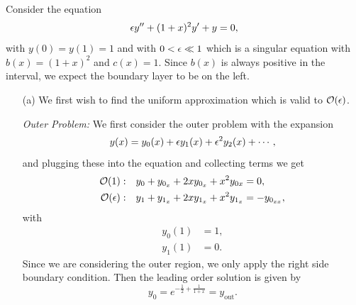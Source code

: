 \documentclass[12pt]{report}
\begin{document}
\begin{solution}

    \noindent
    Consider the equation
    \[
        {\epsilon} y'' + (1+x)^2y' + y = 0,   
    \]
    with $y(0) = y(1) = 1$ and with $0 < {\epsilon} \ll 1$ which is a singular equation with $b(x) = (1+x)^2$ and $c(x) = 1$. Since $b(x)$ is always positive in the interval, we expect the boundary layer to be on the left. 
    \begin{enumerate}
        \item [(a)]
        We first wish to find the uniform approximation which is valid to ${\mathcal{O}}({\epsilon})$.
        
        \noindent
        {\it Outer Problem: }
        We first consider the outer problem with the expansion
        \[ 
            y(x) = y_0(x) + {\epsilon} y_1(x) + {\epsilon}^2 y_2(x)+\cdots,
        \]
        and plugging these into the equation and collecting terms we get
        \begin{align*}
            {\mathcal{O}}(1):& ~~~ y_0 + y_{0_x} + 2x y_{0_x} + x^2 y_{0{x}} = 0,\\
            {\mathcal{O}}({\epsilon}):& ~~~ y_1 + y_{1_x} + 2xy_{1_x} + x^2 y_{1_x} = - y_{0_{xx}},
        \end{align*}
        with
        \begin{align*}
            y_0(1) &= 1,\\
            y_1(1) &= 0.
        \end{align*}
        Since we are considering the outer region, we only apply the right side boundary condition. Then the leading order solution is given by
        \[ 
            y_0 = e^{-\frac{1}{2} + \frac{1}{1+x}} = y_{\text{out}}.
        \]



\end{enumerate}
\end{solution}
\end{document}

